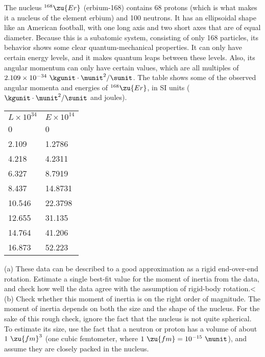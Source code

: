The nucleus $^{168}\zu{Er}$ (erbium-168) contains 68 protons (which is what
makes it a nucleus of the element erbium) and 100 neutrons. It has an
ellipsoidal shape like an American football, with one long axis and two short axes that are of equal
diameter. Because this is a subatomic system, consisting of only 168 particles,
its behavior shows some clear quantum-mechanical properties. It can only have
certain energy levels, and it makes quantum leaps between these levels. Also,
its angular momentum can only have certain values, which are all multiples of
$2.109\times10^{-34}\ \kgunit\cdot\munit^2/\sunit$. The table shows some of the observed
angular momenta and energies of $^{168}\zu{Er}$, in SI units
($\kgunit\cdot\munit^2/\sunit$ and joules).\\
\hspace{50mm}\begin{tabular}{ll}
        $L\times10^{34}$        & $E\times10^{14}$\\
        0                &          0\\
    2.109        &     1.2786\\
    4.218        &     4.2311\\
    6.327        &     8.7919\\
    8.437        &     14.8731\\
    10.546        &     22.3798\\
    12.655        &     31.135\\
    14.764        &     41.206\\
    16.873        &     52.223\\
\end{tabular}\hwendpart
(a) These data can be described to a good approximation as a rigid end-over-end
rotation. Estimate a single best-fit
value for the moment of inertia from the data, and check how well the
data agree with the assumption of rigid-body rotation.<%
(b) Check whether this moment of inertia is on the right order of magnitude.
The moment of inertia depends on both the size and the shape of the nucleus.
For the sake of this rough check, ignore the fact that the nucleus is not quite
spherical. To estimate its size, use the fact that a neutron or proton has a volume
of about $1\ \zu{fm}^3$ (one cubic femtometer, where $1\ \zu{fm}=10^{-15}\ \munit$),
and assume they are closely packed in the nucleus.
